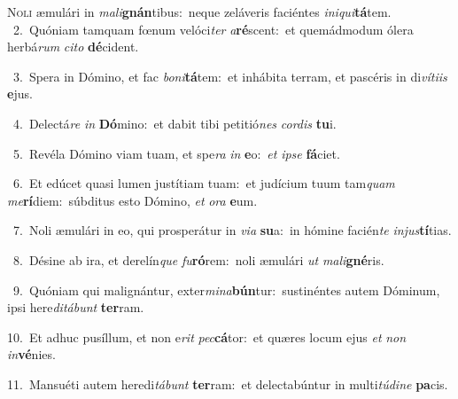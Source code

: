 \lettrine{\initial\textcolor{\initialcolor}{N}}{oli} æmulári in \textit{ma}\-\textit{li}\textbf{gnán}tibus:~\star neque zeláveris faciéntes \textit{in}\-\textit{i}\textit{qui}\textbf{tá}tem.\\
{\numbfont\textcolor{\numbcolor}{~2.}}~Quóniam tamquam fœnum velóci\textit{ter} \textit{a}\-\textbf{ré}scent:~\star et quemádmodum ólera herbá\textit{rum} \textit{ci}\-\textit{to} \textbf{dé}\-cident.\par
{\numbfont\textcolor{\numbcolor}{~3.}}~Spera in Dómino, et fac \textit{bo}\-\textit{ni}\textbf{tá}tem:~\star et inhábita terram, et pascéris in di\-\textit{ví}\-\textit{ti}\textit{is} \textbf{e}\-jus.\par
{\numbfont\textcolor{\numbcolor}{~4.}}~Delectá\textit{re} \textit{in} \textbf{Dó}\-mino:~\star et dabit tibi petitió\textit{nes} \textit{cor}\-\textit{dis} \textbf{tu}\-i.\par
{\numbfont\textcolor{\numbcolor}{~5.}}~Revéla Dómino viam tuam, et spe\textit{ra} \textit{in} \textbf{e}\-o:~\star \textit{et} \textit{ip}\-\textit{se} \textbf{fá}\-ciet.\par
{\numbfont\textcolor{\numbcolor}{~6.}}~Et edúcet quasi lumen justítiam tuam:~\dagger et judícium tuum tam\textit{quam} \textit{me}\-\textbf{rí}diem:~\star súbditus esto Dómino, \textit{et} \textit{o}\-\textit{ra} \textbf{e}\-um.\par
{\numbfont\textcolor{\numbcolor}{~7.}}~Noli æmulári in eo, qui prosperátur in \textit{vi}\-\textit{a} \textbf{su}\-a:~\star in hómine facién\textit{te} \textit{in}\-\textit{jus}\textbf{tí}tias.\par
{\numbfont\textcolor{\numbcolor}{~8.}}~Désine ab ira, et derelín\textit{que} \textit{fu}\-\textbf{ró}rem:~\star noli æmulári \textit{ut} \textit{ma}\-\textit{li}\textbf{gné}ris.\par
{\numbfont\textcolor{\numbcolor}{~9.}}~Quóniam qui malignántur, exter\-\textit{mi}\-\textit{na}\textbf{bún}tur:~\star sustinéntes autem Dóminum, ipsi here\-\textit{di}\-\textit{tá}\textit{bunt} \textbf{ter}\-ram.\par
{\numbfont\textcolor{\numbcolor}{10.}}~Et adhuc pusíllum, et non e\textit{rit} \textit{pec}\-\textbf{cá}tor:~\star et quæres locum ejus \textit{et} \textit{non} \textit{in}\-\textbf{vé}nies.\par
{\numbfont\textcolor{\numbcolor}{11.}}~Mansuéti autem heredi\-\textit{tá}\-\textit{bunt} \textbf{ter}\-ram:~\star et delectabúntur in multi\-\textit{tú}\-\textit{di}\textit{ne} \textbf{pa}\-cis.\par
